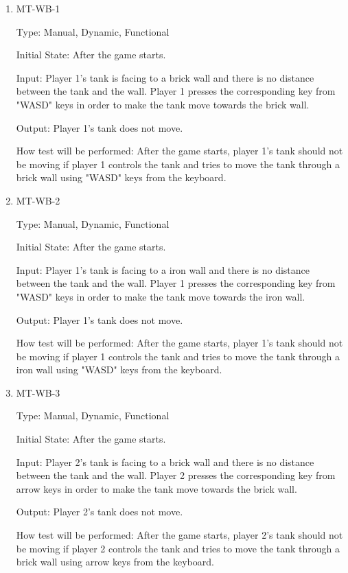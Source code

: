 \documentclass[12pt, titlepage]{article}
\begin{document}
\begin{enumerate}

\item{MT-WB-1\\}

Type: Manual, Dynamic, Functional
					
Initial State: After the game starts.
					
Input: Player 1's tank is facing to a brick wall and there is no distance between the tank and the wall. Player 1 presses the corresponding key from "WASD" keys in order to make the tank move towards the brick wall.
					
Output: Player 1's tank does not move.
					
How test will be performed: After the game starts, player 1's tank should not be moving if player 1 controls the tank and tries to move the tank through a brick wall using "WASD" keys from the keyboard.

\item{MT-WB-2\\}

Type: Manual, Dynamic, Functional
					
Initial State: After the game starts.
					
Input: Player 1's tank is facing to a iron wall and there is no distance between the tank and the wall. Player 1 presses the corresponding key from "WASD" keys in order to make the tank move towards the iron wall.
					
Output: Player 1's tank does not move.
					
How test will be performed: After the game starts, player 1's tank should not be moving if player 1 controls the tank and tries to move the tank through a iron wall using "WASD" keys from the keyboard.

\item{MT-WB-3\\}

Type: Manual, Dynamic, Functional
					
Initial State: After the game starts.
					
Input: Player 2's tank is facing to a brick wall and there is no distance between the tank and the wall. Player 2 presses the corresponding key from arrow keys in order to make the tank move towards the brick wall.
					
Output: Player 2's tank does not move.
					
How test will be performed: After the game starts, player 2's tank should not be moving if player 2 controls the tank and tries to move the tank through a brick wall using arrow keys from the keyboard.


\end{enumerate}
\end{document}

